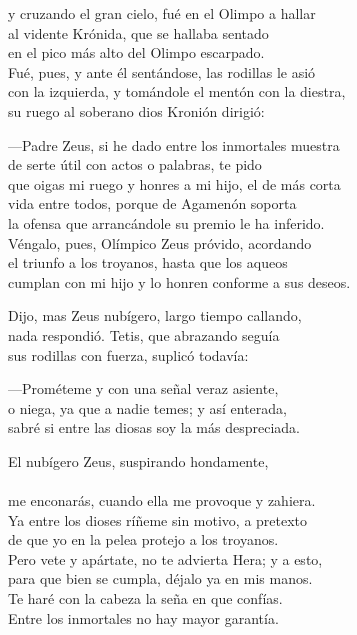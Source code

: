 y cruzando el gran cielo, fué en el Olimpo a hallar\\
al vidente Krónida, que se hallaba sentado\\
en el pico más alto del Olimpo escarpado.\\
Fué, pues, y ante él sentándose, las rodillas le asió\\
con la izquierda, y tomándole el mentón con la diestra,\\
su ruego al soberano dios Kronión dirigió:\par
---Padre Zeus, si he dado entre los inmortales muestra\\
de serte útil con actos o palabras, te pido\\
que oigas mi ruego y honres a mi hijo, el de más corta\\
vida entre todos, porque de Agamenón soporta\\
la ofensa que arrancándole su premio le ha inferido.\\
Véngalo, pues, Olímpico Zeus próvido, acordando\\
el triunfo a los troyanos, hasta que los aqueos\\
cumplan con mi hijo y lo honren conforme a sus deseos.\par
Dijo, mas Zeus nubígero, largo tiempo callando,\\
nada respondió. Tetis, que abrazando seguía\\
sus rodillas con fuerza, suplicó todavía:\par
---Prométeme y con una señal veraz asiente,\\
o niega, ya que a nadie temes; y así enterada,\\
sabré si entre las diosas soy la más despreciada.\par
El nubígero Zeus, suspirando hondamente,\\
\\
me enconarás, cuando ella me provoque y zahiera.\\
Ya entre los dioses ríñeme sin motivo, a pretexto\\
de que yo en la pelea protejo a los troyanos.\\
Pero vete y apártate, no te advierta Hera; y a esto,\\
para que bien se cumpla, déjalo ya en mis manos.\\
Te haré con la cabeza la seña en que confías.\\
Entre los inmortales no hay mayor garantía.\\

